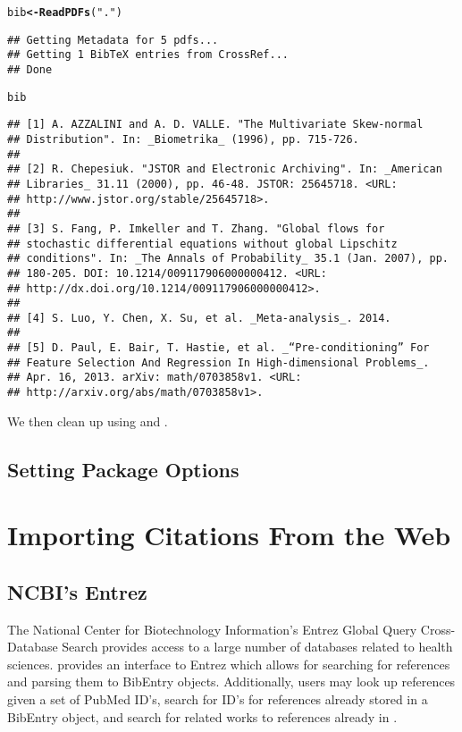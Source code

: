 \documentclass[article]{jss}\usepackage[]{graphicx}\usepackage[]{color}
\makeatletter
\newcommand{\hlstr}[1]{\textcolor[rgb]{0.125,0.125,1}{#1}}%
\newcommand{\hlstd}[1]{\textcolor[rgb]{0.251,0.251,0.282}{#1}}%
\newcommand{\hlkwb}[1]{\textcolor[rgb]{0.439,0.251,1}{\textbf{#1}}}%
\newcommand{\hlkwd}[1]{\textcolor[rgb]{0.251,0.251,0.282}{\textbf{#1}}}%
\newenvironment{kframe}{%
 \def\at@end@of@kframe{}%
 \ifinner\ifhmode%
  \def\at@end@of@kframe{\end{minipage}}%
  \begin{minipage}{\columnwidth}%
 \fi\fi%
 \def\FrameCommand##1{\hskip\@totalleftmargin \hskip-\fboxsep
 \colorbox{shadecolor}{##1}\hskip-\fboxsep
     \hskip-\linewidth \hskip-\@totalleftmargin \hskip\columnwidth}%
 \MakeFramed {\advance\hsize-\width
   \@totalleftmargin\z@ \linewidth\hsize
   \@setminipage}}%
 {\par\unskip\endMakeFramed%
 \at@end@of@kframe}
\newenvironment{knitrout}{}{} %
\newcommand{\ourpkg}{\pkg{RefManageR}}
\makeatother
\begin{document}
\begin{knitrout}
\color{fgcolor}\begin{kframe}
\begin{alltt}
\hlstd{bib} \hlkwb{<-} \hlkwd{ReadPDFs}\hlstd{(}\hlstr{"."}\hlstd{)}
\end{alltt}
\begin{lstlisting}
## Getting Metadata for 5 pdfs...
## Getting 1 BibTeX entries from CrossRef...
## Done
\end{lstlisting}\begin{alltt}
\hlstd{bib}
\end{alltt}
\begin{verbatim}
## [1] A. AZZALINI and A. D. VALLE. "The Multivariate Skew-normal
## Distribution". In: _Biometrika_ (1996), pp. 715-726.
## 
## [2] R. Chepesiuk. "JSTOR and Electronic Archiving". In: _American
## Libraries_ 31.11 (2000), pp. 46-48. JSTOR: 25645718. <URL:
## http://www.jstor.org/stable/25645718>.
## 
## [3] S. Fang, P. Imkeller and T. Zhang. "Global flows for
## stochastic differential equations without global Lipschitz
## conditions". In: _The Annals of Probability_ 35.1 (Jan. 2007), pp.
## 180-205. DOI: 10.1214/009117906000000412. <URL:
## http://dx.doi.org/10.1214/009117906000000412>.
## 
## [4] S. Luo, Y. Chen, X. Su, et al. _Meta-analysis_. 2014.
## 
## [5] D. Paul, E. Bair, T. Hastie, et al. _“Pre-conditioning” For
## Feature Selection And Regression In High-dimensional Problems_.
## Apr. 16, 2013. arXiv: math/0703858v1. <URL:
## http://arxiv.org/abs/math/0703858v1>.
\end{verbatim}
\end{kframe}
\end{knitrout}

We then clean up using  and .
\subsection{Setting Package Options}

\section{Importing Citations From the Web}
\subsection{NCBI's Entrez}
The National Center for Biotechnology Information's Entrez Global Query Cross-Database Search provides access to a large number of databases related to health sciences. \ourpkg{} provides an interface to Entrez which allows for searching for references and parsing them to BibEntry objects.  Additionally, users may look up references given a set of PubMed ID's, search for ID's for references already stored in a BibEntry object, and search for related works to references already in \R{}.
\end{document}
